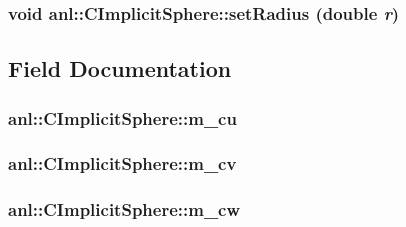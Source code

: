 \label{classanl_1_1CImplicitSphere_ae4b3a1cfdacf4bfb1aaa77a87eb887e8}
\hypertarget{classanl_1_1CImplicitSphere_a02412e8eeb89e7e799d2ca383398a1d5}{
\subsubsection[{setRadius}]{\setlength{\rightskip}{0pt plus 5cm}void anl::CImplicitSphere::setRadius (double {\em r})}}
\label{classanl_1_1CImplicitSphere_a02412e8eeb89e7e799d2ca383398a1d5}


\subsection{Field Documentation}
\hypertarget{classanl_1_1CImplicitSphere_a5fd9fb4ef67bde5265ee17b39ef61899}{
\subsubsection[{m\_\-cu}]{ {\bf anl::CImplicitSphere::m\_\-cu}}}
\label{classanl_1_1CImplicitSphere_a5fd9fb4ef67bde5265ee17b39ef61899}
\hypertarget{classanl_1_1CImplicitSphere_a08460dc1823b374bf63261f73d66a890}{
\subsubsection[{m\_\-cv}]{ {\bf anl::CImplicitSphere::m\_\-cv}}}
\label{classanl_1_1CImplicitSphere_a08460dc1823b374bf63261f73d66a890}
\hypertarget{classanl_1_1CImplicitSphere_afef73aed6144204a4a7c4254664b929c}{
\subsubsection[{m\_\-cw}]{ {\bf anl::CImplicitSphere::m\_\-cw}}}

